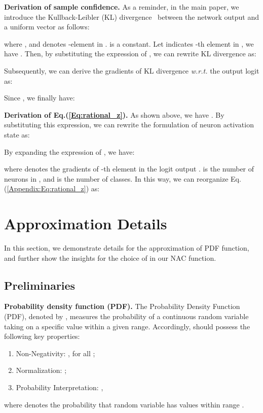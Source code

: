 \documentclass{article} \usepackage{iclr2024_conference,times}
\newcommand{\bfstart}[1]{\noindent\textbf{#1.}}
\begin{document}
\bfstart{Derivation of sample confidence}
As a reminder, in the main paper, we introduce the Kullback-Leibler (KL) divergence~\citep{tech:KL} between the network output and a uniform vector  as follows:

where , and  denotes -element in .
 is a constant. Let  indicates -th element in , we have . Then, by substituting the expression of , we can rewrite KL divergence as:


Subsequently, we can derive the gradients of KL divergence \textit{w.r.t.} the output logit  as: 


Since , we finally have: 



\bfstart{Derivation of Eq.(\ref{Eq:rational_z})} 
As shown above, we have . By substituting this expression, we can rewrite the formulation of neuron activation state  as:


By expanding the expression of  , we have:

where  denotes the gradients of -th element in the logit output .  is the number of neurons in , and  is the number of classes. In this way, we can reorganize Eq.(\ref{Appendix:Eq:rational_z}) as:














\section{Approximation Details}
\label{Appendix:Approximation_Details}
In this section, we demonstrate details for the approximation of PDF function, and further show the insights for the choice of  in our NAC function.

\subsection{Preliminaries} 
\bfstart{Probability density function (PDF)} The Probability Density Function (PDF), denoted by , measures the probability of a continuous random variable taking on a specific value within a given range. Accordingly,  should possess the following key properties: 
\begin{enumerate}[label=(\arabic*),topsep=1pt,parsep=1pt,itemindent=0.5em]
	\item {Non-Negativity}: , for all ; 
	\item {Normalization}: ; 
	\item {Probability Interpretation}: , 
\end{enumerate}
where  denotes the probability that random variable  has values within range . 
\end{document}
